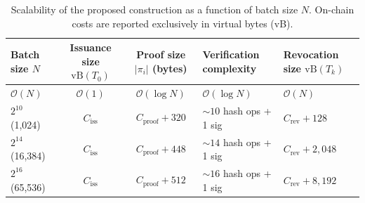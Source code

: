 \begin{table}[t]
\caption{Scalability of the proposed construction as a function of batch size $N$. On-chain costs are reported exclusively in virtual bytes (vB).}
\label{tab:scaling_summary}
\centering
\small
\renewcommand{\arraystretch}{1.2}

\begin{adjustbox}{max width=\linewidth}
\begin{tabular}{
>{\centering\arraybackslash}m{2.8cm}
c
c
>{\centering\arraybackslash}m{4cm}
>{\centering\arraybackslash}m{3.2cm}
}
\toprule
\textbf{Batch size $N$} &
\shortstack{\textbf{Issuance size}\\$\mathrm{vB}(T_0)$} &
\shortstack{\textbf{Proof size}\\$|\pi_i|$ (bytes)} &
\textbf{Verification complexity} &
\shortstack{\textbf{Revocation size}\\$\mathrm{vB}(T_k)$} \\
\midrule

$\mathcal{O}(N)$ &
$\mathcal{O}(1)$ &
$\mathcal{O}(\log N)$ &
$\mathcal{O}(\log N)$ &
$\mathcal{O}(N)$ \\
\midrule

$2^{10}$ (1,024) &
$C_{\mathrm{iss}}$ &
$C_{\mathrm{proof}} + 320$ &
$\sim 10$ hash ops + 1 sig &
$C_{\mathrm{rev}} + 128$ \\

$2^{14}$ (16,384) &
$C_{\mathrm{iss}}$ &
$C_{\mathrm{proof}} + 448$ &
$\sim 14$ hash ops + 1 sig &
$C_{\mathrm{rev}} + 2{,}048$ \\

$2^{16}$ (65,536) &
$C_{\mathrm{iss}}$ &
$C_{\mathrm{proof}} + 512$ &
$\sim 16$ hash ops + 1 sig &
$C_{\mathrm{rev}} + 8{,}192$ \\

\bottomrule
\end{tabular}
\end{adjustbox}

\end{table}
